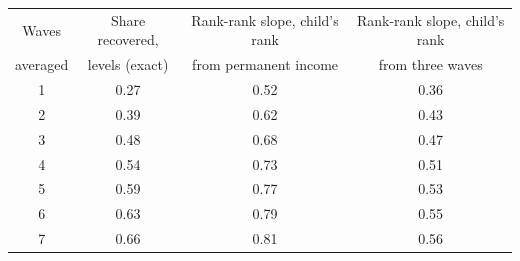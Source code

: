 \begin{tabular}{@{}cccc@{}}
\toprule
Waves & Share recovered, & Rank-rank slope, child's rank & Rank-rank slope, child's rank \\
averaged & levels (exact) & from permanent income & from three waves \\
\midrule
1 & 0.27 & 0.52 & 0.36 \\
2 & 0.39 & 0.62 & 0.43 \\
3 & 0.48 & 0.68 & 0.47 \\
4 & 0.54 & 0.73 & 0.51 \\
5 & 0.59 & 0.77 & 0.53 \\
6 & 0.63 & 0.79 & 0.55 \\
7 & 0.66 & 0.81 & 0.56 \\
\bottomrule
\end{tabular}
